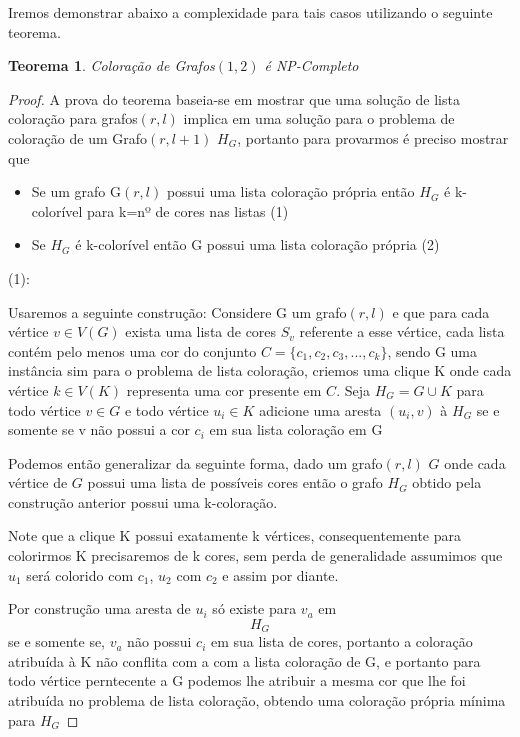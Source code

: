 \documentclass[a4paper,11pt]{article}
\newtheorem{teorema}{Teorema}
\begin{document}
Iremos demonstrar abaixo a complexidade para tais casos utilizando o seguinte teorema. 
    \begin{teorema}
      Coloração de Grafos$(1,2)$ é NP-Completo
    \end{teorema}
    \begin{proof}
      A prova do teorema baseia-se em mostrar que uma solução de lista coloração para grafos$(r,l)$ implica em uma solução para o problema de coloração de um Grafo$(r,l+1)$ $H_G$, portanto para provarmos é preciso mostrar que
      \begin{itemize}
        \item Se um grafo G$(r,l)$ possui uma lista coloração própria então $H_G$ é k-colorível para k=nº de cores nas listas (1)
        \item Se $H_G$ é k-colorível então G possui uma lista coloração própria (2)
      \end{itemize}
      (1):\newline
      
      Usaremos a seguinte construção:\newline
      Considere G um grafo$(r,l)$ e que para cada vértice $v \in V(G)$ exista uma lista de cores $S_v$ referente a esse vértice, cada lista contém pelo menos uma cor do conjunto $C = \{c_1,c_2,c_3,...,c_k \}$, sendo G uma instância sim para o problema de lista coloração, criemos uma clique K onde cada vértice $k \in V(K)$ representa uma cor presente em $C$. Seja $H_G = G \cup K$ para todo vértice $v \in G$ e todo vértice $u_i \in K$ adicione uma aresta $(u_i,v)$ à $H_G$ se e somente se v não possui a cor $c_i$ em sua lista coloração em G
      
      Podemos então generalizar da seguinte forma, dado um grafo$(r,l)$ $G$ onde cada vértice de $G$ possui uma lista de possíveis cores então o grafo $H_G$ obtido pela construção anterior possui uma k-coloração.
      
      Note que a clique K possui exatamente k vértices, consequentemente para colorirmos K precisaremos de k cores, sem perda de generalidade assumimos que $u_1$ será colorido com $c_1$, $u_2$ com $c_2$ e assim por diante.
      
      Por construção uma aresta de $u_i$ só existe para $v_a$ em $$H_G$$ se e somente se, $v_a$ não possui $c_i$ em sua lista de cores, portanto a coloração atribuída à K não conflita com a com a lista coloração de G, e portanto para todo vértice perntecente a G podemos lhe atribuir a mesma cor que lhe foi atribuída no problema de lista coloração, obtendo uma coloração própria mínima para $H_G$
      

\end{proof}
\end{document}
